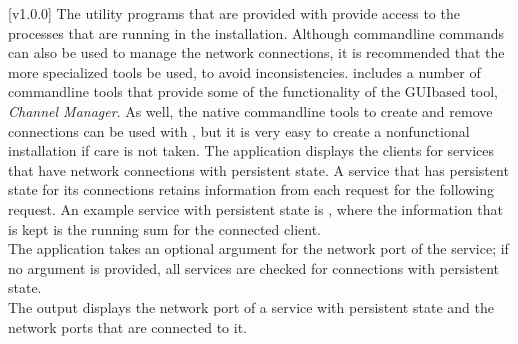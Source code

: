 [v1.0.0]
The utility programs that are provided with \mplusm{} provide access to the processes that
are running in the \mplusm{} installation.
Although command\longDash{}line \yarp{} commands can also be used to manage the network
connections, it is recommended that the more specialized \mplusm{} tools be used, to avoid
inconsistencies.
\mplusm{} includes a number of command\longDash{}line tools that provide some of the
functionality of the GUI\longDash{}based tool, \emph{Channel Manager}.
As well, the native \yarp{} command\longDash{}line tools to create and remove connections
can be used with \mplusm, but it is very easy to create a non\longDash{}functional
installation if care is not taken.
The application  displays the clients for services that have
\yarp{} network connections with persistent state.
A service that has persistent state for its connections retains information from each
request for the following request.
An example service with persistent state is
, where the information that is kept is the
running sum for the connected client.\\

The application takes an optional argument for the \yarp{} network port of the service;
if no argument is provided, all services are checked for connections with persistent
state.
\insertFullUtilityParameters\\

The output displays the \yarp{} network port of a service with persistent state and the
\yarp{} network ports that are connected to it.\\

